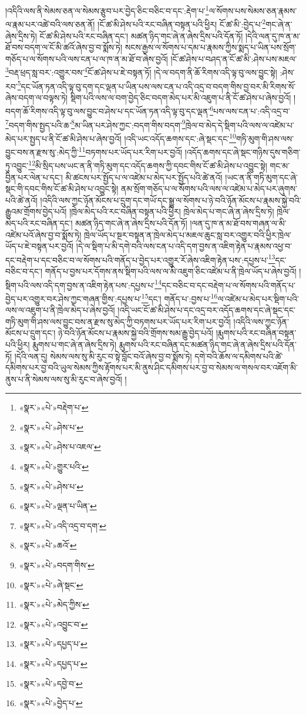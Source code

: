 །འདིའི་ལས་ནི་སེམས་ཅན་ལ་སེམས་རྩུབ་པར་བྱེད་ཅིང་བཅིང་བ་དང་:རྡེག་པ་\footnote{«སྣར་»«པེ་»བརྡེག་པ་}ལ་སོགས་པས་སེམས་ཅན་རྣམས་ལ་རྣམ་པར་འཚེ་བའི་ལས་ཅན་ནོ། །ངོ་ཚ་མི་ཤེས་པའི་རང་བཞིན་བསྟན་པའི་ཕྱིར། ངོ་ཚ་མི་:བྱེད་པ་\footnote{«སྣར་»«པེ་»ཤེས་པ་}གང་ཞེ་ན་ཞེས་དྲིས་ཏེ། ངོ་ཚ་མི་ཤེས་པའི་རང་བཞིན་དང་། མཚན་ཉིད་གང་ཞེ་ན་ཞེས་དྲིས་པའི་དོན་ཏོ། །དེའི་ལན་དུ་ཁ་ན་མ་ཐོ་བས་བདག་ལ་ངོ་མི་ཚའོ་ཞེས་བྱ་བ་སྨོས་ཏེ། སངས་རྒྱས་ལ་སོགས་པ་དམ་པ་རྣམས་ཀྱིས་སྨད་པ་ཡིན་པས་སྲོག་གཅོད་པ་ལ་སོགས་པའི་ལས་ངན་པ་ལ་ཁ་ན་མ་ཐོ་བ་ཞེས་བྱའོ། །ངོ་ཚ་ཤེས་པ་བཤད་ན་ངོ་ཚ་མི་:ཤེས་པས་མཇལ་\footnote{«སྣར་»«པེ་»ཤེས་པ་འཇལ་}བརྡ་ཕྲད་སླ་བར་:འགྱུར་བས་\footnote{«སྣར་»«པེ་»གྱུར་པའི་}ངོ་ཚ་ཤེས་པ་ཇེ་བསྟན་ཏོ། །དེ་ལ་བདག་ནི་ཆོ་རིགས་འདི་ལྟ་བུ་ལས་བྱུང་སྟེ། :ཤེས་རབ་\footnote{«སྣར་»«པེ་»ཤེས་པ་}དང་ཡོན་ཏན་འདི་ལྟ་བུ་དག་དང་ལྡན་པ་ཡིན་པས་ལས་ངན་པ་འདི་འདྲ་བ་བདག་གིས་བྱ་བར་མི་རིགས་སོ་ཞེས་བདག་ལ་བལྟས་ཏེ། སྡིག་པའི་ལས་ལ་བག་བྱེད་ཅིང་བདག་མེད་པར་མི་འཇུག་པ་ནི་ངོ་ཚ་ཤེས་པ་ཞེས་བྱའོ། །བདག་ཆོ་རིགས་འདི་ལྟ་བུ་ལས་བྱུང་བ་ཤེས་པ་དང་ཡོན་ཏན་འདི་ལྟ་བུ་དང་ལྡན་\footnote{«སྣར་»«པེ་»ལྡན་པ་ཡིན་}པས་ལས་ངན་པ་:འདི་འདྲ་བ་\footnote{«སྣར་»«པེ་»འདི་འདྲ་བ་དག་}བདག་གིས་སྤྱད་པའི་ཆ་\footnote{«སྣར་»«པེ་»ཆའོ་}མ་ཡིན་པར་ཤེས་ཀྱང་:བདག་གིས་བདག་\footnote{«སྣར་»«པེ་»བདག་གིས་}ཁྲེལ་བ་མེད་དེ་སྡིག་པའི་ལས་ལ་འཛེམ་པ་མེད་པར་སྤྱད་པ་ནི་ངོ་ཚ་མི་ཤེས་པ་ཞེས་བྱའོ། །འདི་ཡང་འདོད་ཆགས་དང་:ཞེ་སྡང་དང་\footnote{«སྣར་»«པེ་»ཞེ་སྡང་}གཏི་མུག་གི་ཤས་ལས་བྱུང་བས་ན་རྫས་སུ་:མེད་ཀྱི་\footnote{«སྣར་»«པེ་»མེད་ཀྱིས་}བཏགས་པར་ཡོད་པར་རིག་པར་བྱའོ། །འདོད་ཆགས་དང་ཞེ་སྡང་གཉིས་དུས་གཅིག་ཏུ་འབྱུང་\footnote{«སྣར་»«པེ་»འབྱུང་བ་}མི་སྲིད་པས་ཡང་ན་ནི་གཏི་མུག་དང་འདོད་ཆགས་ཀྱི་དབང་གིས་ངོ་ཚ་མི་ཤེས་པ་འབྱུང་སྟེ། གང་མ་བྱིན་པར་ལེན་པ་དང་། མི་ཚངས་པར་སྤྱོད་པ་ལ་འཛེམ་པ་མེད་པར་སྤྱོད་པའི་ཚེ་ནའོ། །ཡང་ན་ནི་གཏི་མུག་དང་ཞེ་སྡང་གི་དབང་གིས་ངོ་ཚ་མི་ཤེས་པ་འབྱུང་སྟེ། ནམ་སྲོག་གཅོད་པ་ལ་སོགས་པའི་ལས་ལ་འཛེམ་པ་མེད་པར་ཞུགས་པའི་ཚེ་ནའོ། །འདིའི་ལས་ཀྱང་ཉོན་མོངས་པ་དྲུག་དང་གཡོ་དང་སྒྱུ་ལ་སོགས་པ་ཉེ་བའི་ཉོན་མོངས་པ་རྣམས་སྐྱེ་བའི་རྒྱུའམ་གྲོགས་བྱེད་པའོ། །ཁྲེལ་མེད་པའི་རང་བཞིན་བསྟན་པའི་ཕྱིར། ཁྲེལ་མེད་པ་གང་ཞེ་ན་ཞེས་དྲིས་ཏེ། ཁྲེལ་མེད་པའི་རང་བཞིན་དང་། མཚན་ཉིད་གང་ཞེ་ན་ཞེས་དྲིས་པའི་དོན་ཏོ། །ལན་དུ་ཁ་ན་མ་ཐོ་བས་གཞན་ལ་མི་འཛེམ་པའོ་ཞེས་བྱ་བ་སྨོས་ཏེ། ཁྲེལ་ཡོད་པ་སྔར་བསྟན་ན་ཁྲེལ་མེད་པ་མཇལ་ཆུང་སླ་བར་འགྱུར་བའི་ཕྱིར་ཁྲེལ་ཡོད་པ་ཇེ་བསྟན་པར་བྱའོ། །དེ་ལ་སྡིག་པ་མི་དགེ་བའི་ལས་ངན་པ་འདི་དག་བྱས་ན་འཇིག་རྟེན་པ་རྣམས་འཕྱ་བ་དང་བརྡེག་པ་དང་བཅིང་བ་ལ་སོགས་པའི་གནོད་པ་བྱེད་པར་འགྱུར་རོ་ཞེས་འཇིག་རྟེན་པས་:དཔྱས་པ་\footnote{«སྣར་»«པེ་»དཔྱད་པ་}དང་བཅིང་བ་དང་། གནོད་པ་བྱས་པར་དོགས་ནས་སྡིག་པའི་ལས་ལ་མི་འཇུག་ཅིང་འཛེམ་པ་ནི་ཁྲེལ་ཡོད་པ་ཞེས་བྱའོ། །སྡིག་པའི་ལས་འདི་དག་བྱས་ན་འཇིག་རྟེན་པས་:དཔྱས་པ་\footnote{«སྣར་»«པེ་»དཔྱད་པ་}དང་བཅིང་བ་དང་བརྡེག་པ་ལ་སོགས་པའི་གནོད་པ་བྱེད་པར་འགྱུར་བར་ཤེས་ཀྱང་གཞན་གྱིས་:དཔྱས་པ་\footnote{«སྣར་»«པེ་»དབྱེ་བ་}དང་། གནོད་པ་:བྱས་པ་\footnote{«སྣར་»«པེ་»བྱེད་པ་}ལ་འཛེམ་པ་མེད་པར་སྡིག་པའི་ལས་ལ་འཇུག་པ་ནི་ཁྲེལ་མེད་པ་ཞེས་བྱའོ། །འདི་ཡང་ངོ་ཚ་མི་ཤེས་པ་དང་འདྲ་བར་འདོད་ཆགས་དང་ཞེ་སྡང་དང་གཏི་མུག་གི་ཤས་ལས་བྱུང་བས་ན་རྫས་སུ་མེད་ཀྱི་བཏགས་པར་ཡོད་པར་རིག་པར་བྱའོ། །འདིའི་ལས་ཀྱང་ཉོན་མོངས་པ་དྲུག་དང་། ཉེ་བའི་ཉོན་མོངས་པ་རྣམས་སྐྱེ་བའི་གྲོགས་སམ་རྒྱུ་བྱེད་པའོ། །རྨུགས་པའི་རང་བཞིན་བསྟན་པའི་ཕྱིར། རྨུགས་པ་གང་ཞེ་ན་ཞེས་དྲིས་ཏེ། རྨུགས་པའི་རང་བཞིན་དང་མཚན་ཉིད་གང་ཞེ་ན་ཞེས་དྲིས་པའི་དོན་ཏོ། །དེའི་ལན་དུ། སེམས་ལས་སུ་མི་རུང་བ་སྟེ་བློང་བའོ་ཞེས་བྱ་བ་སྨོས་ཏེ། དགེ་བའི་ཆོས་ལ་དམིགས་པའི་ཚེ་དམིགས་པར་བྱ་བའི་ཡུལ་སེམས་ཀྱིས་རྟོགས་པར་མི་ནུས་ཤིང་དམིགས་པར་བྱ་བ་སེམས་ལ་གསལ་བར་འཇོག་མི་ནུས་པ་ནི་སེམས་ལས་སུ་མི་རུང་བ་ཞེས་བྱའོ། །
